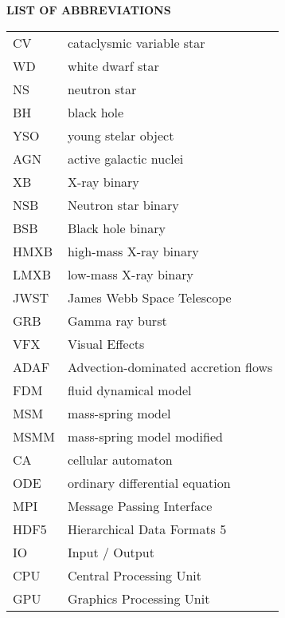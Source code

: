 \newpage
{}
{}
\noindent \Large \textbf{LIST OF ABBREVIATIONS}
\normalsize

\vspace{1cm}

\begin{center}
\def\arraystretch{1.5}%
\setlength\tabcolsep{1cm}
\begin{tabular}{ll}
    CV			& cataclysmic variable star \\
    WD			& white dwarf star \\
    NS          & neutron star \\
    BH          & black hole \\
    YSO         & young stelar object \\
    AGN         & active galactic nuclei \\
    XB          & X-ray binary \\
    NSB         & Neutron star binary \\
    BSB         & Black hole binary \\
    HMXB        & high-mass X-ray binary \\
    LMXB        & low-mass X-ray binary \\
    JWST        & James Webb Space Telescope \\
    GRB         & Gamma ray burst \\
    VFX         & Visual Effects \\
    ADAF        & Advection-dominated accretion flows \\
    FDM			& fluid dynamical model \\
    MSM			& mass-spring model \\
    MSMM		& mass-spring model modified \\
    CA			& cellular automaton \\
    ODE			& ordinary differential equation \\
    MPI         & Message Passing Interface \\
    HDF5        & Hierarchical Data Formats 5 \\
    IO          & Input / Output \\
    CPU         & Central Processing Unit \\
    GPU         & Graphics Processing Unit
\end{tabular}
\end{center}
